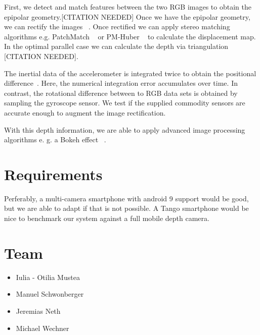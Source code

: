 \documentclass[a4paper,pagesize 10pt]{scrartcl}
\begin{document}

First, we detect and match features between the two RGB images to obtain the epipolar geometry.[CITATION NEEDED]
Once we have the epipolar geometry, we can rectify the images ~\cite{loop1999}. Once rectified we can apply stereo matching algorithms e.g. PatchMatch ~\cite{Bleyer2011} or PM-Huber ~\cite{Heise2013} to calculate the displacement map. In the optimal parallel case we can calculate the depth via triangulation [CITATION NEEDED]. 

The inertial data of the accelerometer is integrated twice to obtain the positional difference~\cite{Seifert2007}. Here, the numerical integration error accumulates over time. In contrast, the rotational difference between to RGB data sets is obtained by sampling the gyroscope sensor. We test if the supplied commodity sensors are accurate enough to augment the image rectification.

With this depth information, we are able to apply advanced image processing algorithms e. g. a Bokeh effect ~\cite{Lee2008}.


\section{Requirements}
Perferably, a multi-camera smartphone with android 9 support would be good, but we are able to adapt if that is not possible. A Tango smartphone would be nice to benchmark our system against a full mobile depth camera.
\section{Team}
\begin{itemize}
	\item Iulia - Otilia Mustea
	\item Manuel Schwonberger
	\item Jeremias Neth
	\item Michael Wechner
\end{itemize}


{\small
	
	
}
\end{document}
